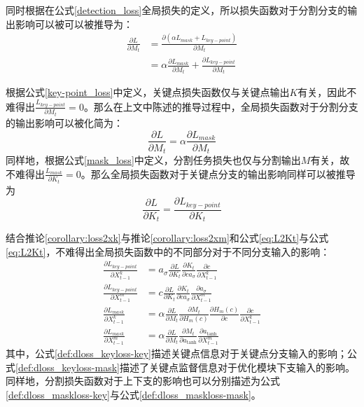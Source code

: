 同时根据在公式\eqref{detection_loss}全局损失的定义，所以损失函数对于分割分支的输出影响可以被可以被推导为：
\begin{equation*}
\begin{aligned}
\frac{\partial L}{\partial M_t} &= \frac{\partial (\alpha L_{mask} + L_{key-point})}{\partial M_t}\\
&= \alpha\frac{\partial L_{mask}}{\partial M_t} + \frac{\partial L_{key-point}}{\partial M_t}
\end{aligned}
\end{equation*}

根据公式\eqref{key-point_loss}中定义，关键点损失函数仅与关键点输出$K$有关，因此不难得出$\frac{L_{key-point}}{\partial M_t}=0$。那么在上文中陈述的推导过程中，全局损失函数对于分割分支的输出影响可以被化简为：
\begin{equation}
\label{eq:L2Mt}
\frac{\partial L}{\partial M_t} = \alpha\frac{\partial L_{mask}}{\partial M_t}
\end{equation}
同样地，根据公式\eqref{mask_loss}中定义，分割任务损失也仅与分割输出$M$有关，故不难得出$\frac{L_{mask}}{\partial K_t}=0$。那么全局损失函数对于关键点分支的输出影响同样可以被推导为
\begin{equation}
\label{eq:L2Kt}
\frac{\partial L}{\partial K_t} = \frac{\partial L_{key-point}}{\partial K_t}
\end{equation}

结合推论\ref{corollary:loss2xk}与推论\ref{corollary:loss2xm}和公式\eqref{eq:L2Kt}与公式\eqref{eq:L2Kt}，不难得出全局损失函数中的不同部分对于不同分支输入的影响：
\begin{align}
\frac{\partial L_{key-point}}{\partial X^k_{t-1}} &= a_{\sigma}\frac{\partial L}{\partial K_t}\frac{\partial K_t}{\partial ca_{\sigma}}\frac{\partial c}{\partial X_{t-1}^k}\label{def:dloss_keyloss-key}\\
\frac{\partial L_{key-point}}{\partial X^m_{t-1}} &= c\frac{\partial L}{\partial K_t}\frac{\partial K_t}{\partial ca_{\sigma}}\frac{\partial a_{\sigma}}{\partial X^m_{t-1}}\label{def:dloss_keyloss-mask}\\
\frac{\partial L_{mask}}{\partial X^k_{t-1}} &= \alpha\frac{\partial L}{\partial M_t}\frac{\partial M_t}{\partial H_m(c)}\frac{\partial H_m(c)}{\partial c}\frac{\partial c}{\partial X_{t-1}^k}\label{def:dloss_maskloss-key}\\
\frac{\partial L_{mask}}{\partial X^m_{t-1}} &= \alpha\frac{\partial L}{\partial M_t}\frac{\partial M_t}{\partial a_{\tanh}}\frac{\partial a_{\tanh}}{\partial X^m_{t-1}}\label{def:dloss_maskloss-mask}
\end{align}
其中，公式\eqref{def:dloss_keyloss-key}描述关键点信息对于关键点分支输入的影响；公式\eqref{def:dloss_keyloss-mask}描述了关键点监督信息对于优化模块下支输入的影响。同样地，分割损失函数对于上下支的影响也可以分别描述为公式\eqref{def:dloss_maskloss-key}与公式\eqref{def:dloss_maskloss-mask}。

